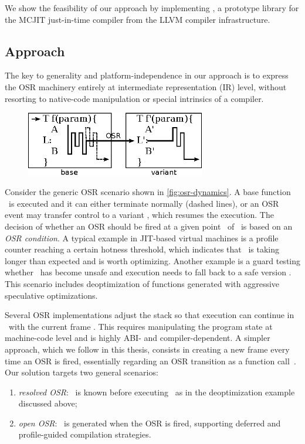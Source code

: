 \noindent We show the feasibility of our approach by implementing \osrkit, a prototype library for the MCJIT just-in-time compiler from the LLVM compiler infrastructure.

\subsection{Approach}
\label{ss:osr-llvm-approach}

The key to generality and platform-independence in our approach is to express the OSR machinery entirely at intermediate representation (IR) level, without resorting to native-code manipulation or special intrinsics of a compiler.

\ifdefined\noauthorea
\begin{figure}[hb]
\begin{center}
\includegraphics[width=0.7\textwidth]{figures/osr-dynamics/osr-dynamics.eps}
\caption{\protect}
\end{center}
\end{figure}
\fi

\noindent Consider the generic OSR scenario shown in \myfigure\ref{fig:osr-dynamics}. A base function \fbase\ is executed and it can either terminate normally (dashed lines), or an OSR event may transfer control to a variant \fvariant, which resumes the execution. The decision of whether an OSR should be fired at a given point \osrpoint\ of \fbase\ is based on an {\em OSR condition}. A typical example in JIT-based virtual machines is a profile counter reaching a certain hotness threshold, which indicates that \fbase\ is taking longer than expected and is worth optimizing. Another example is a guard testing whether \fbase\ has become unsafe and execution needs to fall back to a safe version \fvariant. This scenario includes deoptimization of functions generated with aggressive speculative optimizations.

Several OSR implementations adjust the stack so that execution can continue in \fvariant\ with the current frame \cite{Chambers91, Chambers92, Holzle92, Suganuma06}. This requires manipulating the program state at machine-code level and is highly ABI- and compiler-dependent. A simpler approach, which we follow in this thesis, consists in creating a new frame every time an OSR is fired, essentially regarding an OSR transition as a function call~\cite{Lameed13,Pizlo14}. Our solution targets two general scenarios:
\begin{enumerate}[parsep=0pt]
 \item {\em resolved OSR}: \fvariant\ is known before executing \fbase\ as in the deoptimization example discussed above;
 \item {\em open OSR}: \fvariant\ is generated when the OSR is fired, supporting deferred and profile-guided compilation strategies.
\end{enumerate}

